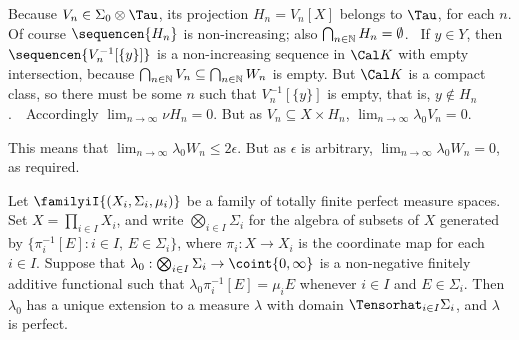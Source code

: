 {Because $V_n\in\Sigma_0\otimes\Tau$, its projection $H_n=V_n[X]$ belongs
to $\Tau$, for each $n$.   Of course $\sequencen{H_n}$ is
non-increasing;  also $\bigcap_{n\in\Bbb N}H_n=\emptyset$.   \Prf\ If
$y\in Y$, then $\sequencen{V_n^{-1}[\{y\}]}$ is a non-increasing
sequence in $\Cal K$ with empty intersection, because $\bigcap_{n\in\Bbb
N}V_n\subseteq\bigcap_{n\in\Bbb N}W_n$ is empty.  But $\Cal K$ is a
compact class, so there must be some $n$ such that $V_n^{-1}[\{y\}]$ is
empty, that is, $y\notin H_n$.\ \QeD\  Accordingly $\lim_{n\to\infty}\nu
H_n=0$.   But as $V_n\subseteq X\times H_n$,
$\lim_{n\to\infty}\lambda_0V_n=0$.

This means that $\lim_{n\to\infty}\lambda_0W_n\le 2\epsilon$.   But as
$\epsilon$ is arbitrary, $\lim_{n\to\infty}\lambda_0W_n=0$, as required.
}%

 Let
$\familyiI{(X_i,\Sigma_i,\mu_i)}$ be a family
of totally finite perfect measure spaces.   Set $X=\prod_{i\in I}X_i$,
and write $\bigotimes_{i\in I}\Sigma_i$ for the algebra of subsets of
$X$ generated by $\{\pi_i^{-1}[E]:i\in I,\,E\in\Sigma_i\}$, where
$\pi_i:X\to X_i$ is the coordinate map for each $i\in I$.   Suppose that
$\lambda_0:\bigotimes_{i\in I}\Sigma_i\to\coint{0,\infty}$ is a
non-negative finitely additive functional such that
$\lambda_0\pi_i^{-1}[E]=\mu_iE$ whenever $i\in I$ and $E\in\Sigma_i$.
Then $\lambda_0$ has a unique extension to a measure $\lambda$ with
domain $\Tensorhat_{i\in I}\Sigma_i$, and $\lambda$ is perfect.

